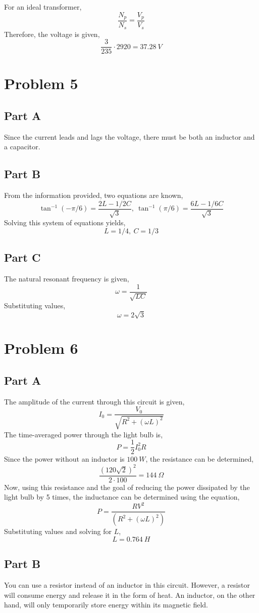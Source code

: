 \documentclass{article}
\begin{document}
For an ideal transformer,
$$ \frac{N_p}{N_s} = \frac{V_p}{V_s} $$
Therefore, the voltage is given,
$$ \frac{3}{235} \cdot 2920 = 37.28\ \si{V} $$

\section*{Problem 5}

\subsection*{Part A}

Since the current leads and lags the voltage, there must be both an inductor and
a capacitor.

\subsection*{Part B}

From the information provided, two equations are known,
$$ \tan^{-1}(-\pi/6) = \frac{2L - 1/2C}{\sqrt{3}},\ \tan^{-1}(\pi/6) = \frac{6L -
1/6C}{\sqrt{3}} $$
Solving this system of equations yields,
$$ L = 1/4,\ C = 1/3 $$

\subsection*{Part C}

The natural resonant frequency is given,
$$ \omega = \frac{1}{\sqrt{LC}} $$
Substituting values,
$$ \omega = 2 \sqrt{3} $$

\section*{Problem 6}

\subsection*{Part A}

The amplitude of the current through this circuit is given,
$$ I_0 = \frac{V_0}{\sqrt{R^2 + (\omega L)^2}} $$
The time-averaged power through the light bulb is,
$$ P = \frac{1}{2} I_0^2 R $$
Since the power without an inductor is $100\ \si{W}$, the resistance can be
determined,
$$ \frac{(120 \sqrt{2})^2}{2 \cdot 100} = 144\ \si{\Omega} $$
Now, using this resistance and the goal of reducing the power dissipated by the
light bulb by 5 times, the inductance can be determined using the equation,
$$ P = \frac{R V^2}{(R^2 + (\omega L)^2)} $$
Substituting values and solving for $L$,
$$ L = 0.764\ \si{H} $$

\subsection*{Part B}

You can use a resistor instead of an inductor in this circuit. However, a
resistor will consume energy and release it in the form of heat. An inductor,
on the other hand, will only temporarily store energy within its magnetic field.
\end{document}
